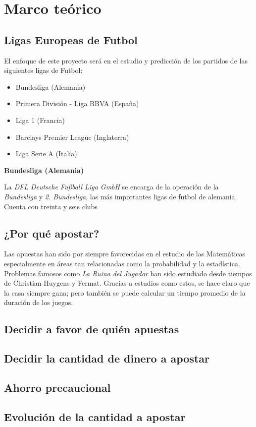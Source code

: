 \chapter{Marco teórico}
\section{Ligas Europeas de Futbol}
El enfoque de este proyecto será en el estudio y predicción de los partidos de las siguientes ligas de Futbol:
\begin{itemize}
	
	\item Bundesliga\cite{bundesliga} (Alemania)
	
	\item Primera División - Liga BBVA\cite{primera} (España)

	\item Liga 1\cite{ligue1} (Francia)
	
	\item Barclays Premier League\cite{premier} (Inglaterra)
	
	\item Liga Serie A\cite{serieA} (Italia)

\end{itemize}


\textbf{Bundesliga (Alemania)}

La \emph{DFL Deutsche Fußball Liga GmbH} se encarga de la operación de la \emph{Bundesliga} y \emph{2. Bundesliga}, las más importantes ligas de futbol de alemania. Cuenta con treinta y seis clubs 

\section{¿Por qué apostar?}
Las apuestas han sido por siempre favorecidas en el estudio de las Matemáticas especialmente en áreas tan relacionadas como la probabilidad y la estadística.
Problemas famosos como \emph{La Ruina del Jugador}\cite[p.~95-99]{ross2006first} han sido estudiado desde tiempos de Christian Huygens y Fermat. Gracias a estudios como estos, se hace claro que la casa siempre gana; pero también se puede calcular un tiempo promedio de la duración de los juegos.


\section{Decidir a favor de quién apuestas}
\section{Decidir la cantidad de dinero a apostar}
\section{Ahorro precaucional}
\section{Evolución de la cantidad a apostar}
